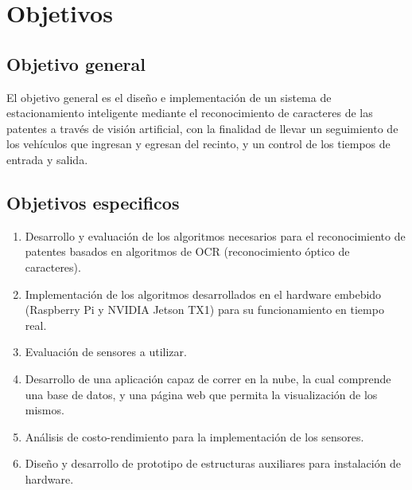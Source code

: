 \section{Objetivos}

\subsection{Objetivo general}

El objetivo general es el diseño e implementación de un sistema de estacionamiento inteligente mediante el reconocimiento de caracteres de las patentes a través de visión artificial, con la finalidad de llevar un seguimiento de los vehículos que ingresan y egresan del recinto, y un control de los tiempos de entrada y salida.

\subsection{Objetivos especificos}

\begin{enumerate}
    \item Desarrollo y evaluación de los algoritmos necesarios para el reconocimiento de patentes basados en algoritmos de OCR (reconocimiento óptico de caracteres).
    \item Implementación de los algoritmos desarrollados en el hardware embebido (Raspberry Pi y NVIDIA Jetson TX1) para su funcionamiento en tiempo real.
    \item Evaluación de sensores a utilizar.
    \item Desarrollo de una aplicación capaz de correr en la nube, la cual comprende una base de datos, y una página web que permita la visualización de los mismos.
    \item Análisis de costo-rendimiento para la implementación de los sensores.
    \item Diseño y desarrollo de prototipo de estructuras auxiliares para instalación de hardware.
\end{enumerate}






